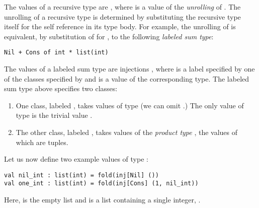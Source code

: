 The values of a recursive type  are , where  is a value of the \emph{unrolling} of . The {unrolling} of a recursive type is determined by substituting the recursive type itself for the self reference in its type body. For example, the unrolling of  is equivalent, by substitution of  for , to the following \emph{labeled sum type}:
\begin{lstlisting}[numbers=none]
Nil + Cons of int * list(int)
\end{lstlisting}
The values of a labeled sum type  are injections , where  is a label specified by one of the classes specified by  and  is a value of the corresponding type. The {labeled sum type} above specifies two {classes}:
\begin{enumerate}
\item One class, labeled , takes values of  type (we can omit .) The only value of  type is the trivial value \li{()}.  
\item The other class, labeled , takes values of the \emph{product type} , the values of which are tuples. 
\end{enumerate}

Let us now define two example values of type :
\begin{lstlisting}[numbers=none]
val nil_int : list(int) = fold(inj[Nil] ())
val one_int : list(int) = fold(inj[Cons] (1, nil_int))
\end{lstlisting}
Here,  is the empty list and  is a list containing a single integer, . %

